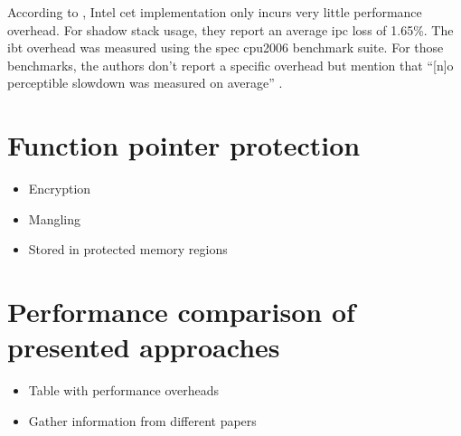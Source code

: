 \bigskip\noindent
According to \citeauthor{Shanbhogue2019} \cite{Shanbhogue2019}, Intel \gls{cet} implementation only incurs very little performance overhead.
For shadow stack usage, they report an average \gls{ipc} loss of 1.65\%.
The \gls{ibt} overhead was measured using the \gls{spec} \acs{cpu}2006 benchmark suite.
For those benchmarks, the authors don't report a specific overhead but mention that ``[n]o perceptible slowdown was measured on average'' \cite{Shanbhogue2019}.

\section{Function pointer protection}
\label{sec:function-pointer-protection-improvements}


\begin{itemize}
	\item{Encryption}
	\item{Mangling}
	\item{Stored in protected memory regions}
\end{itemize}

\section{Performance comparison of presented approaches}
\label{sec:performance-comparison}

\begin{itemize}
	\item{Table with performance overheads}
	\item{Gather information from different papers}
\end{itemize}